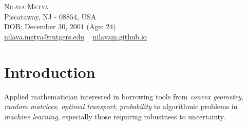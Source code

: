 
\usepackage{tabto}
\usepackage{setspace}
\usepackage{etaremune}
\usepackage{comment}
\usepackage{xcolor}
\newcommand*\circled[1]{\tikz[baseline=(char.base)]{
            \node[shape=circle,draw,inner sep=1pt, line width=1.1pt] (char) {#1};}}





\begin{center}
    {\vspace{-10pt}\Huge \scshape Nilava Metya} \\ \vspace{1pt}
    Piscataway, NJ - $08854$, USA\\
    DOB: December $30$, $2001$ (Age: $24$)\\ \vspace{1pt}
{\small 
\href{mailto:nilava.metya@rutgers.edu}{\circled{\scriptsize\faEnvelope}  \underline{nilava.metya@rutgers.edu}} ~ 
{\circled{\scriptsize\faHome} \underline{\url{nilavam.github.io}}}}
\end{center}




\section{Introduction}
Applied mathematician interested in borrowing tools from \textit{convex geometry}, \textit{random matrices}, \textit{optimal transport}, \textit{probability} to algorithmic problems in \textit{machine learning}, especially those requiring robustness to uncertainty.
\vspace{\gap}
